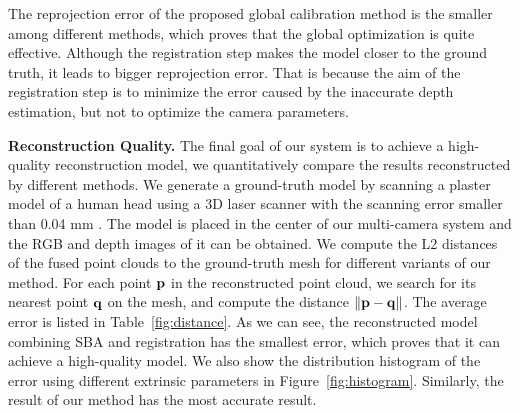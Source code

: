 The reprojection error of the proposed global calibration method is the smaller  among different methods, which proves that the global optimization is quite effective. 
Although the registration step makes the model closer to the ground truth, it leads to bigger reprojection error. That is because the aim of the registration step is to minimize the error caused by the inaccurate depth estimation, but not to optimize the camera parameters.


\noindent\textbf{Reconstruction Quality.}
The final goal of our system is to achieve a high-quality reconstruction model, we quantitatively compare the results reconstructed by different methods.
%
We generate a ground-truth model by scanning a plaster model of a human head using a 3D laser scanner with the scanning error smaller than 0.04 mm . 
%
The model is placed in the center of our multi-camera system and the RGB and depth images of it can be obtained. 
We compute the L2 distances of the fused point clouds to the ground-truth mesh for different variants of our method. 
For each point $\mathbf{p}$ in the reconstructed point cloud, we search for its nearest point $\mathbf{q}$ on the mesh, and compute the distance $\|\mathbf{p}-\mathbf{q}\|$. 
%
The average error is listed in Table~\ref{fig:distance}.  
As we can see, the reconstructed model combining SBA and registration has the smallest error, which proves that it can achieve a high-quality model.
We also show the distribution histogram of the error using different extrinsic parameters in Figure~\ref{fig:histogram}. 
Similarly, the result of our method has the most accurate result.

